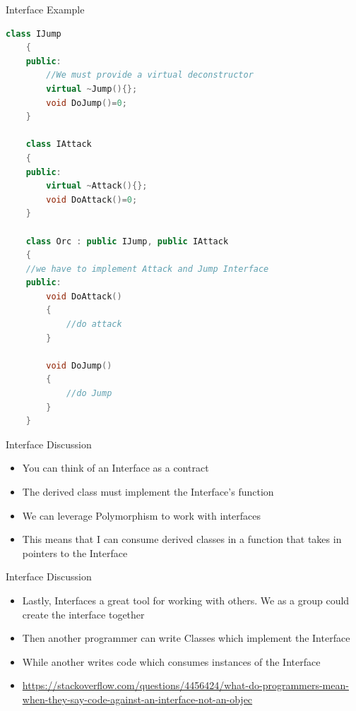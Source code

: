 \begin{frame}[fragile]{Interface Example}
	\begin{lstlisting}[language=C++,basicstyle=\tiny,]
	class IJump
	{
	public:
		//We must provide a virtual deconstructor
		virtual ~Jump(){};
		void DoJump()=0;
	}
	
	class IAttack
	{
	public:
		virtual ~Attack(){};
		void DoAttack()=0;
	}
	
	class Orc : public IJump, public IAttack
	{
	//we have to implement Attack and Jump Interface
	public:
		void DoAttack()
		{
			//do attack
		}
		
		void DoJump()
		{
			//do Jump
		}
	}
	\end{lstlisting}
\end{frame}

\begin{frame}{Interface Discussion}
	\begin{itemize}
		\pause \item You can think of an Interface as a contract
		\pause \item The derived class must implement the Interface's function
		\pause \item We can leverage Polymorphism to work with interfaces
		\pause \item This means that I can consume derived classes in a function that takes in pointers to the Interface
	\end{itemize}
\end{frame}

\begin{frame}{Interface Discussion}
	\begin{itemize}
		\pause \item Lastly, Interfaces a great tool for working with others. We as a group could create the interface together
		\pause \item Then another programmer can write Classes which implement the Interface
		\pause \item While another writes code which consumes instances of the Interface 
		\pause \item \url{https://stackoverflow.com/questions/4456424/what-do-programmers-mean-when-they-say-code-against-an-interface-not-an-objec} 
	\end{itemize}
\end{frame}